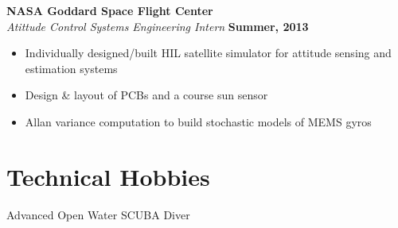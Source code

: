 \documentclass[margin,line]{resume}
\begin{document}
\begin{resume}
    \textbf{NASA Goddard Space Flight Center}\\
    \textsl{Atittude Control Systems Engineering Intern} \hfill \textbf{Summer, 2013}\\ \vspace{-4mm}
    \begin{itemize} \itemsep -2pt
        \item Individually designed/built HIL satellite simulator for attitude sensing and estimation systems
        \item Design \& layout of PCBs and a course sun sensor
        \item Allan variance computation to build stochastic models of MEMS gyros
    \end{itemize}
  
\section{\mysidestyle Technical Hobbies}
Advanced Open Water SCUBA Diver 

\begin{comment}
    \textbf{Stanford Space Rendezvous Lab}\\
    \textsl{Graduate Student Researcher} \hfill \textbf{Spring, 2014}\\ \vspace{-4mm}
    \begin{itemize} \itemsep -2pt
        \item Simulating GPS-based orbit estimation for relative navigation of formation flying satellites
    \end{itemize} \vspace{-2.25mm}

    \textbf{Stanford Autonomous Systems Lab}\\
    \textsl{Graduate Student Researcher} \hfill \textbf{Winter, 2014}\\ \vspace{-4mm}
    \begin{itemize} \itemsep -2pt
        \item Investigate global stability of cyclic pursuit control laws for satellite formation flight
    \end{itemize} \vspace{-2.25mm}
    

\end{comment}
\end{resume}
\end{document}
